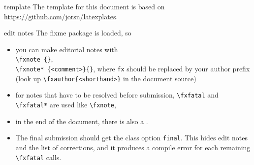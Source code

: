 \begingroup
\def\cmd#1{\texttt{\textbackslash{}#1}}
\begin{anfxnote}[author=\noindent JR]{template}
  The template for this document is based on
  \url{https://github.com/jorsn/latexplates}.
\end{anfxnote}

\begin{anfxwarning}{edit notes}
  The \textsf{fixme} package is loaded, so
  \begin{itemize}
    \item you can make editorial notes with
      \\
        \texttt{\cmd{fxnote}%
      \twocol{\\\hbox{}\quad}%
          \{<margin comment>\}},
      \\
        \texttt{\cmd{fxnote*}%
      \twocol{\\\hbox{}\quad}%
          \{<comment>\}\{<text to highlight>\}},
        where \texttt{fx} should be replaced by your author prefix (look up
        \texttt{\cmd{fxauthor}\{<shorthand>\}} in the document source)

  \item
    for notes that have to be resolved before submission,
    \cmd{fxfatal} and \cmd{fxfatal*} are used like \cmd{fxnote},

  \item
    in the end of the document, there is also a \MakeLowercase\englishlistfixmename .

  \item
    The final submission should get the class option \texttt{final}. This hides
    edit notes and the list of corrections, and it produces a compile error for
    each remaining \cmd{fxfatal} calls.
\end{itemize}
\end{anfxwarning}
\endgroup

